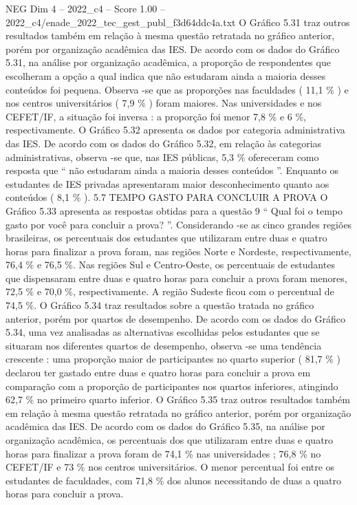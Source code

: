 \begin{textsample}{NEG Dim 4 – 2022\_c4 – Score 1.00 – 2022\_c4/enade\_2022\_tec\_gest\_publ\_f3d64ddc4a.txt}
O Gráfico 5.31 traz outros resultados também em relação à mesma questão retratada no gráfico anterior, porém por organização acadêmica das IES.
De acordo com os dados do Gráfico 5.31, na análise por organização acadêmica, a proporção de respondentes que escolheram a opção a qual indica que não estudaram ainda a maioria desses conteúdos foi pequena.
Observa -se que as proporções nas faculdades ( 11,1 \% ) e nos centros universitários ( 7,9 \% ) foram maiores.
Nas universidades e nos CEFET/IF, a situação foi inversa : a proporção foi menor 7,8 \% e 6 \%, respectivamente.
O Gráfico 5.32 apresenta os dados por categoria administrativa das IES.
De acordo com os dados do Gráfico 5.32, em relação às categorias administrativas, observa -se que, nas IES públicas, 5,3 \% ofereceram como resposta que “ não estudaram ainda a maioria desses conteúdos ”.
Enquanto os estudantes de IES privadas apresentaram maior desconhecimento quanto aos conteúdos ( 8,1 \% ). 5.7 TEMPO GASTO PARA CONCLUIR A PROVA O Gráfico 5.33 apresenta as respostas obtidas para a questão 9 “ Qual foi o tempo gasto por você para concluir a prova? ”.
Considerando -se as cinco grandes regiões brasileiras, os percentuais dos estudantes que utilizaram entre duas e quatro horas para finalizar a prova foram, nas regiões Norte e Nordeste, respectivamente, 76,4 \% e 76,5 \%.
Nas regiões Sul e Centro-Oeste, os percentuais de estudantes que dispensaram entre duas e quatro horas para concluir a prova foram menores, 72,5 \% e 70,0 \%, respectivamente.
A região Sudeste ficou com o percentual de 74,5 \%.
O Gráfico 5.34 traz resultados sobre a questão tratada no gráfico anterior, porém por quartos de desempenho.
De acordo com os dados do Gráfico 5.34, uma vez analisadas as alternativas escolhidas pelos estudantes que se situaram nos diferentes quartos de desempenho, observa -se uma tendência crescente : uma proporção maior de participantes no quarto superior ( 81,7 \% ) declarou ter gastado entre duas e quatro horas para concluir a prova em comparação com a proporção de participantes nos quartos inferiores, atingindo 62,7 \% no primeiro quarto inferior.
O Gráfico 5.35 traz outros resultados também em relação à mesma questão retratada no gráfico anterior, porém por organização acadêmica das IES.
De acordo com os dados do Gráfico 5.35, na análise por organização acadêmica, os percentuais dos que utilizaram entre duas e quatro horas para finalizar a prova foram de 74,1 \% nas universidades ; 76,8 \% no CEFET/IF e 73 \% nos centros universitários.
O menor percentual foi entre os estudantes de faculdades, com 71,8 \% dos alunos necessitando de duas a quatro horas para concluir a prova.

\end{textsample}
